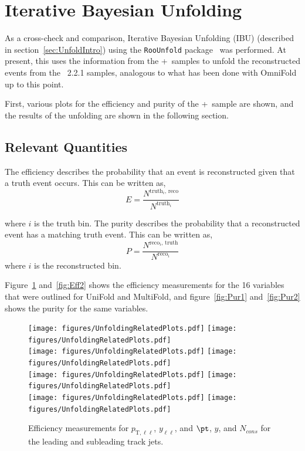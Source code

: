 \section{Iterative Bayesian Unfolding}

As a cross-check and comparison, %
Iterative Bayesian Unfolding (IBU) (described in section~\ref{sec:UnfoldIntro}) using the \texttt{RooUnfold} package~\cite{Adye:2011gm} was performed. At present, this uses the information from the \powheg+\pythia~samples to unfold the reconstructed events from the \sherpa~2.2.1 samples, analogous to what has been done with OmniFold up to this point.

First, various plots for the efficiency and purity of the \powheg+\pythia~sample are shown, and the results of the unfolding are shown in the following section.

\subsection{Relevant Quantities}
The efficiency describes the probability that an event is reconstructed given that a truth event occurs. This can be written as,
\begin{equation}
  E=\frac{N^{\text{truth$_i$, reco}}}{N^{\text{truth$_i$}}}
\end{equation}

where $i$ is the truth bin. The purity describes the probability that a reconstructed event has a matching truth event. This can be written as,
\begin{equation}
  P=\frac{N^{\text{reco$_i$, truth}}}{N^{\text{reco$_i$}}}
\end{equation}
where $i$ is the reconstructed bin.

Figure~\ref{fig:Eff1} and~\ref{fig:Eff2} shows the efficiency measurements for the 16 variables that were outlined for UniFold and MultiFold, and figure~\ref{fig:Pur1} and~\ref{fig:Pur2} shows the purity for the same variables.

\begin{figure}[h!]
  \centering
  \texttt{[image: figures/UnfoldingRelatedPlots.pdf]}
  \texttt{[image: figures/UnfoldingRelatedPlots.pdf]} \\
  \texttt{[image: figures/UnfoldingRelatedPlots.pdf]}
  \texttt{[image: figures/UnfoldingRelatedPlots.pdf]} \\
  \texttt{[image: figures/UnfoldingRelatedPlots.pdf]}
  \texttt{[image: figures/UnfoldingRelatedPlots.pdf]} \\
  \texttt{[image: figures/UnfoldingRelatedPlots.pdf]}
  \texttt{[image: figures/UnfoldingRelatedPlots.pdf]}
  \caption{Efficiency measurements for $p_{\text{T},\ell\ell}$, $y_{\ell\ell}$, and $\pt$, $y$, and $N_{cons}$ for the leading and subleading track jets.}
  \label{fig:Eff1}
\end{figure}


